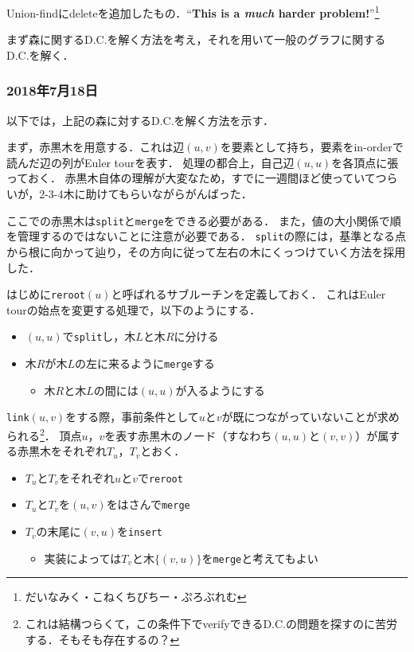 \documentclass[a4paper]{jsarticle}
\begin{document}
Union-findにdeleteを追加したもの．{``}\textbf{This is a \textit{much} harder problem!}{''}\footnote{だいなみく・こねくちびちー・ぷろぶれむ}

まず森に関するD.C.を解く方法を考え，それを用いて一般のグラフに関するD.C.を解く．

\subsubsection{2018年7月18日}
以下では，上記の森に対するD.C.を解く方法を示す．

まず，赤黒木を用意する．これは辺$(u, v)$を要素として持ち，要素をin-orderで読んだ辺の列がEuler tourを表す．
処理の都合上，自己辺$(u, u)$を各頂点に張っておく．
赤黒木自体の理解が大変なため，すでに一週間ほど使っていてつらいが，2-3-4木に助けてもらいながらがんばった．

ここでの赤黒木は\texttt{split}と\texttt{merge}をできる必要がある．
また，値の大小関係で順を管理するのではないことに注意が必要である．
\texttt{split}の際には，基準となる点から根に向かって辿り，その方向に従って左右の木にくっつけていく方法を採用した．

はじめに\texttt{reroot}$(u)$と呼ばれるサブルーチンを定義しておく．
これはEuler tourの始点を変更する処理で，以下のようにする．
\begin{itemize}
\item $(u, u)$で\texttt{split}し，木$L$と木$R$に分ける
\item 木$R$が木$L$の左に来るように\texttt{merge}する
  \begin{itemize}
  \item 木$R$と木$L$の間には$(u, u)$が入るようにする
  \end{itemize}
\end{itemize}

\texttt{link}$(u, v)$をする際，事前条件として$u$と$v$が既につながっていないことが求められる\footnote{これは結構つらくて，この条件下でverifyできるD.C.の問題を探すのに苦労する．そもそも存在するの？}．
頂点$u$，$v$を表す赤黒木のノード（すなわち$(u, u)$と$(v, v)$）が属する赤黒木をそれぞれ$T_u$，$T_v$とおく．
\begin{itemize}
\item $T_u$と$T_v$をそれぞれ$u$と$v$で\texttt{reroot}
\item $T_u$と$T_v$を$(u, v)$をはさんで\texttt{merge}
\item $T_v$の末尾に$(v, u)$を\texttt{insert}
  \begin{itemize}
  \item 実装によっては$T_v$と木$\{(v, u)\}$を\texttt{merge}と考えてもよい
  \end{itemize}
\end{itemize}
\end{document}

